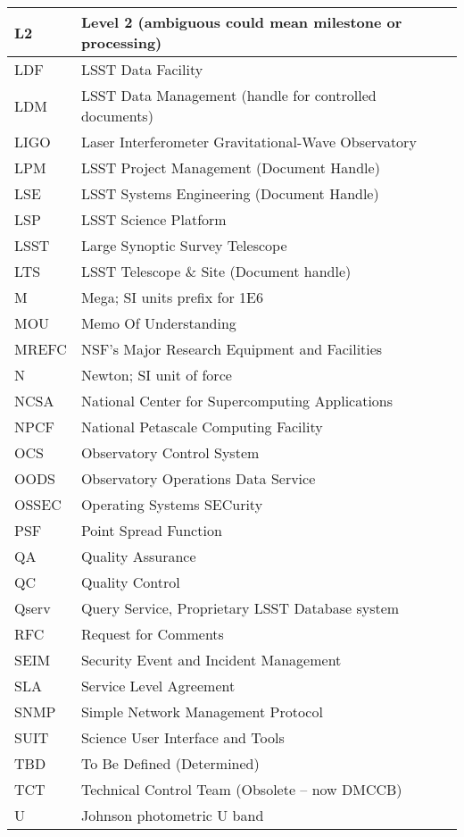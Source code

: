 \begin{longtable}{|l|p{}|}
L2 & Level 2 (ambiguous could mean milestone or processing) \\\hline
LDF & LSST Data Facility \\\hline
LDM & LSST Data Management (handle for controlled documents) \\\hline
LIGO & Laser Interferometer Gravitational-Wave Observatory \\\hline
LPM & LSST Project Management (Document Handle) \\\hline
LSE & LSST Systems Engineering (Document Handle) \\\hline
LSP & LSST Science Platform \\\hline
LSST & Large Synoptic Survey Telescope \\\hline
LTS & LSST Telescope \& Site (Document handle) \\\hline
M & Mega; SI units prefix for 1E6 \\\hline
MOU & Memo Of Understanding \\\hline
MREFC & NSF's Major Research Equipment and Facilities \\\hline
N & Newton; SI unit of force \\\hline
NCSA & National Center for Supercomputing Applications \\\hline
NPCF & National Petascale Computing Facility \\\hline
OCS & Observatory Control System \\\hline
OODS & Observatory Operations Data Service \\\hline
OSSEC & Operating Systems SECurity \\\hline
PSF & Point Spread Function \\\hline
QA & Quality Assurance \\\hline
QC & Quality Control \\\hline
Qserv & Query Service, Proprietary LSST Database system \\\hline
RFC & Request for Comments \\\hline
SEIM & Security Event and Incident Management \\\hline
SLA & Service Level Agreement \\\hline
SNMP & Simple Network Management Protocol \\\hline
SUIT & Science User Interface and Tools \\\hline
TBD & To Be Defined (Determined) \\\hline
TCT & Technical Control Team (Obsolete -- now DMCCB) \\\hline
U & Johnson photometric U band \\\hline

\end{longtable}
